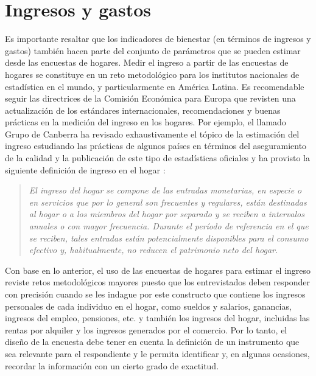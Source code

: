 \documentclass[
  12pt,
]{book}
\begin{document}
\hypertarget{ingresos-y-gastos}{%
\section{Ingresos y gastos}\label{ingresos-y-gastos}}

Es importante resaltar que los indicadores de bienestar (en términos de ingresos y gastos) también hacen parte del conjunto de parámetros que se pueden estimar desde las encuestas de hogares. Medir el ingreso a partir de las encuestas de hogares se constituye en un reto metodológico para los institutos nacionales de estadística en el mundo, y particularmente en América Latina. Es recomendable seguir las directrices de la Comisión Económica para Europa que revisten una actualización de los estándares internacionales, recomendaciones y buenas prácticas en la medición del ingreso en los hogares. Por ejemplo, el llamado Grupo de Canberra ha revisado exhaustivamente el tópico de la estimación del ingreso estudiando las prácticas de algunos países en términos del aseguramiento de la calidad y la publicación de este tipo de estadísticas oficiales y ha provisto la siguiente definición de ingreso en el hogar \citep{United-Nations_2011}:

\begin{quote}
\emph{El ingreso del hogar se compone de las entradas monetarias, en especie o en servicios que por lo general son frecuentes y regulares, están destinadas al hogar o a los miembros del hogar por separado y se reciben a intervalos anuales o con mayor frecuencia. Durante el período de referencia en el que se reciben, tales entradas están potencialmente disponibles para el consumo efectivo y, habitualmente, no reducen el patrimonio neto del hogar.}
\end{quote}

Con base en lo anterior, el uso de las encuestas de hogares para estimar el ingreso reviste retos metodológicos mayores puesto que los entrevistados deben responder con precisión cuando se les indague por este constructo que contiene los ingresos personales de cada individuo en el hogar, como sueldos y salarios, ganancias, ingresos del empleo, pensiones, etc. y también los ingresos del hogar, incluidas las rentas por alquiler y los ingresos generados por el comercio. Por lo tanto, el diseño de la encuesta debe tener en cuenta la definición de un instrumento que sea relevante para el respondiente y le permita identificar y, en algunas ocasiones, recordar la información con un cierto grado de exactitud.
\end{document}
